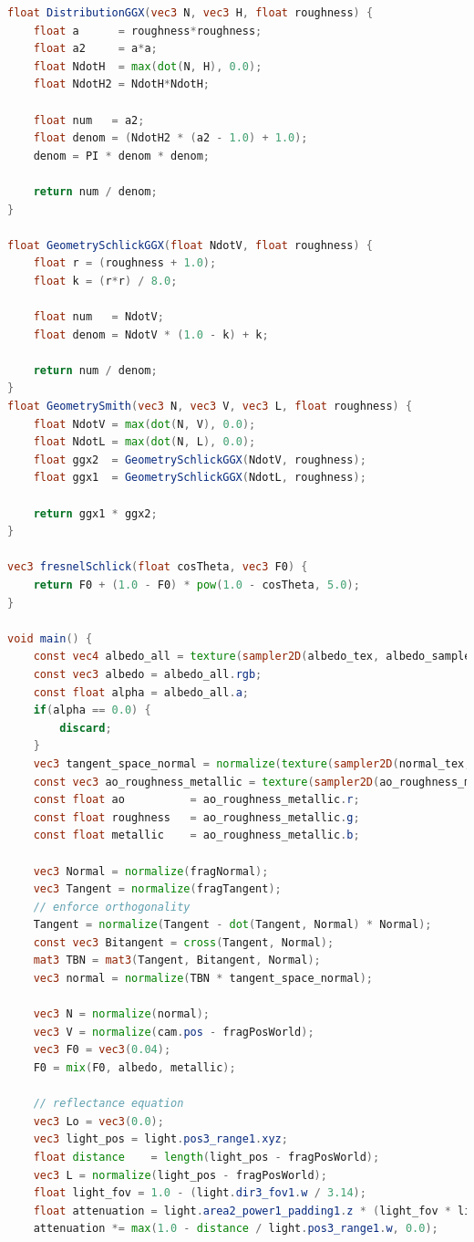 \documentclass[oneside]{ausarbeitung}
\begin{document}
\begin{lstlisting}[language=glsl, label={lst:fragment_shader}, caption={Kompletter GLSL-Code des Fragment-Shaders der in der \textbf{spider}-Engine für das \ac{PBR} benutzt wird}]
float DistributionGGX(vec3 N, vec3 H, float roughness) {
    float a      = roughness*roughness;
    float a2     = a*a;
    float NdotH  = max(dot(N, H), 0.0);
    float NdotH2 = NdotH*NdotH;
	
    float num   = a2;
    float denom = (NdotH2 * (a2 - 1.0) + 1.0);
    denom = PI * denom * denom;
	
    return num / denom;
}

float GeometrySchlickGGX(float NdotV, float roughness) {
    float r = (roughness + 1.0);
    float k = (r*r) / 8.0;

    float num   = NdotV;
    float denom = NdotV * (1.0 - k) + k;
	
    return num / denom;
}
float GeometrySmith(vec3 N, vec3 V, vec3 L, float roughness) {
    float NdotV = max(dot(N, V), 0.0);
    float NdotL = max(dot(N, L), 0.0);
    float ggx2  = GeometrySchlickGGX(NdotV, roughness);
    float ggx1  = GeometrySchlickGGX(NdotL, roughness);
	
    return ggx1 * ggx2;
}

vec3 fresnelSchlick(float cosTheta, vec3 F0) {
    return F0 + (1.0 - F0) * pow(1.0 - cosTheta, 5.0);
}

void main() {
    const vec4 albedo_all = texture(sampler2D(albedo_tex, albedo_sampler), fragTexCoords).rgba;
    const vec3 albedo = albedo_all.rgb;
    const float alpha = albedo_all.a;
    if(alpha == 0.0) {
        discard;
    }
    vec3 tangent_space_normal = normalize(texture(sampler2D(normal_tex, normal_sampler), fragTexCoords).xyz * vec3(2.0, 2.0, 1.0) - vec3(1.0, 1.0, 0.0));
    const vec3 ao_roughness_metallic = texture(sampler2D(ao_roughness_metallic_tex, arm_sampler), fragTexCoords).rgb;
    const float ao          = ao_roughness_metallic.r;
    const float roughness   = ao_roughness_metallic.g;
    const float metallic    = ao_roughness_metallic.b;

    vec3 Normal = normalize(fragNormal);
    vec3 Tangent = normalize(fragTangent);
    // enforce orthogonality
    Tangent = normalize(Tangent - dot(Tangent, Normal) * Normal);
    const vec3 Bitangent = cross(Tangent, Normal);
    mat3 TBN = mat3(Tangent, Bitangent, Normal);
    vec3 normal = normalize(TBN * tangent_space_normal);

    vec3 N = normalize(normal);
    vec3 V = normalize(cam.pos - fragPosWorld);
    vec3 F0 = vec3(0.04); 
    F0 = mix(F0, albedo, metallic);
	           
    // reflectance equation
    vec3 Lo = vec3(0.0);
    vec3 light_pos = light.pos3_range1.xyz;
    float distance    = length(light_pos - fragPosWorld);
    vec3 L = normalize(light_pos - fragPosWorld);
    float light_fov = 1.0 - (light.dir3_fov1.w / 3.14);
    float attenuation = light.area2_power1_padding1.z * (light_fov * light_fov);
    attenuation *= max(1.0 - distance / light.pos3_range1.w, 0.0);
    

\end{lstlisting}
\end{document}
